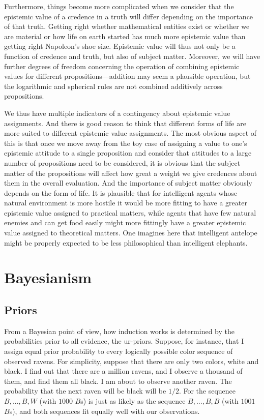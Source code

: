 Furthermore, things become more complicated when we consider that the epistemic value of a credence in a truth will
differ depending on the importance of that truth. Getting right whether mathematical entities exist or whether we are 
material or how life on earth started has much more epistemic value than getting right Napoleon's shoe size. Epistemic
value will thus not only be a function of credence and truth, but also of subject matter. Moreover, we will have 
further degrees of freedom concerning the operation of combining epistemic values for different propositions---addition
may seem a plausible operation, but the logarithmic and spherical rules are not combined additively across propositions.

We thus have multiple indicators of a contingency about epistemic value assignments. And there is good reason to think
that different forms of life are more suited to different epistemic value assignments. The most obvious aspect of this
is that once we move away from the toy case of assigning a value to one's epistemic attitude to a single proposition
and consider that attitudes to a large number of propositions need to be considered, it is obvious that the subject
matter of the propositions will affect how great a weight we give credences about them in the overall evaluation. And
the importance of subject matter obviously depends on the form of life. It is plausible that for intelligent agents whose
natural environment is more hostile it would be more fitting to have a greater epistemic 
value assigned to practical matters, while agents that have few natural enemies and can get food easily might more fittingly
have a greater epistemic value assigned to theoretical matters. One imagines here that intelligent antelope might be
properly expected to be less philosophical than intelligent elephants.

\section{Bayesianism}
\subsection{Priors}
From a Bayesian point of view, how induction works is determined by the probabilities prior to all evidence, the ur-priors.
Suppose, for instance, that I assign equal prior probability to every logically possible color sequence of observed ravens. 
For simplicity, suppose that there are only two colors, white and black.  I find out that there are a million ravens, and 
I observe a thousand of them, and find them all black. I am about to observe another raven. The probability that the next 
raven will be black will be $1/2$. For the sequence $B,...,B,W$ (with $1000$ $B$s) is just as likely as the sequence
$B,...,B,B$ (with $1001$ $B$s), and both sequences fit equally well with our observations. 

